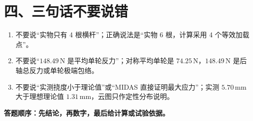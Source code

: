 \documentclass[UTF8,a4paper,11pt,fontset=none]{ctexart}
\newcommand{\mm}{\,\mathrm{mm}}
\newcommand{\N}{\,\mathrm{N}}
\begin{document}
\section*{四、三句话不要说错}
\begin{enumerate}
  \item 不要说“实物只有 4 根横杆”；正确说法是“实物 6 根，计算采用 4 个等效加载点”。
  \item 不要说“$148.49\N$ 是平均单轮反力”；对称平均单轮是 $74.25\N$，$148.49\N$ 是后轴总反力或单轮极端包络。
  \item 不要说“实测挠度小于理论值”或“MIDAS 直接证明最大应力”；实测 $5.70\mm$ 大于理想理论值 $1.31\mm$，云图只作定性分布说明。
\end{enumerate}

\vfill
\begin{center}\small\textbf{答题顺序：先结论，再数字，最后给计算或试验依据。}\end{center}
\end{document}
